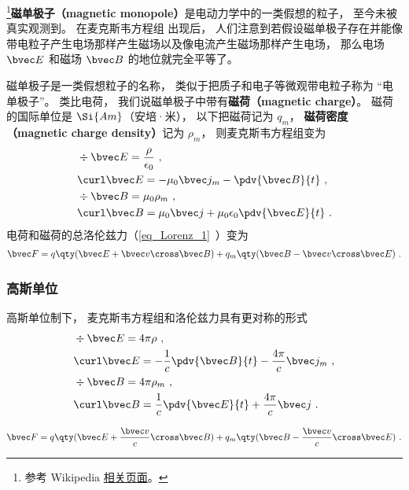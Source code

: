 
\begin{issues}
\issueDraft
\end{issues}



\footnote{参考 Wikipedia \href{https://en.wikipedia.org/wiki/Magnetic_monopole}{相关页面}。}\textbf{磁单极子（magnetic monopole）}是电动力学中的一类假想的粒子， 至今未被真实观测到。 在麦克斯韦方程组 出现后， 人们注意到若假设磁单极子存在并能像带电粒子产生电场那样产生磁场以及像电流产生磁场那样产生电场， 那么电场 $\bvec E$ 和磁场 $\bvec B$ 的地位就完全平等了。

磁单极子是一类假想粒子的名称， 类似于把质子和电子等微观带电粒子称为 “电单极子”。 类比电荷， 我们说磁单极子中带有\textbf{磁荷（magnetic charge）}。 磁荷的国际单位是 $\Si{Am}$（安培·米）， 以下把磁荷记为 $q_m$， \textbf{磁荷密度（magnetic charge density）}记为 $\rho_m$， 则麦克斯韦方程组变为
\begin{equation}
\begin{aligned}
&\div \bvec E = \frac{\rho}{\epsilon_0}~,\\
&\curl \bvec E = - \mu_0 \bvec j_m -\pdv{\bvec B}{t}~,\\
&\div \bvec B = \mu_0 \rho_m~,\\
&\curl \bvec B = \mu_0 \bvec j + \mu_0\epsilon_0 \pdv{\bvec E}{t}~.
\end{aligned}
\end{equation}
电荷和磁荷的总洛伦兹力（\autoref{eq_Lorenz_1}~）变为
\begin{align}
\bvec F = q \qty(\bvec E + \bvec v \cross \bvec B) +
q_m \qty(\bvec B - \bvec v \cross \bvec E)~.
\end{align}

\subsubsection{高斯单位}
高斯单位制下， 麦克斯韦方程组和洛伦兹力具有更对称的形式
\begin{equation}\label{eq_BMono_1}
\begin{aligned}
&\div \bvec E = 4\pi\rho~,\\
&\curl \bvec E = -\frac{1}{c}\pdv{\bvec B}{t}  - \frac{4\pi}{c}\bvec j_m~,\\
&\div \bvec B = 4\pi\rho_m~,\\
&\curl \bvec B = \frac{1}{c}\pdv{\bvec E}{t} + \frac{4\pi}{c} \bvec j~.
\end{aligned}
\end{equation}

\begin{equation}
\bvec F = q \qty(\bvec E + \frac{\bvec v}{c}\cross \bvec B) + q_m \qty(\bvec B - \frac{\bvec v}{c}\cross \bvec E)~.
\end{equation}
